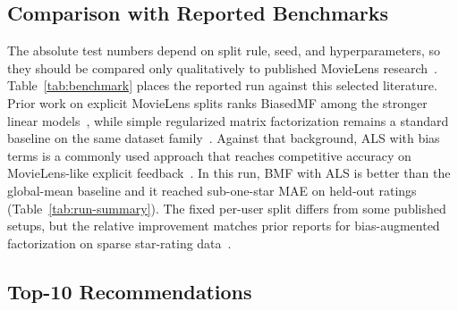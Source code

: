 \documentclass[conference]{IEEEtran}
\begin{document}
\subsection{Comparison with Reported Benchmarks}

The absolute test numbers depend on split rule, seed, and hyperparameters, so they should be compared only qualitatively to published MovieLens research~\cite{ref2,ref5}. Table~\ref{tab:benchmark} places the reported run against this selected literature. Prior work on explicit MovieLens splits ranks BiasedMF among the stronger linear models~\cite{ref2}, while simple regularized matrix factorization remains a standard baseline on the same dataset family~\cite{ref5}. Against that background, ALS with bias terms is a commonly used approach that reaches competitive accuracy on MovieLens-like explicit feedback~\cite{ref1}. In this run, BMF with ALS is better than the global-mean baseline and it reached sub-one-star MAE on held-out ratings (Table~\ref{tab:run-summary}). The fixed per-user split differs from some published setups, but the relative improvement matches prior reports for bias-augmented factorization on sparse star-rating data~\cite{ref1,ref2,ref10}.

\begin{table}[htbp]
\caption{Comparison with themes in the selected literature}
\label{tab:benchmark}
\centering
\small
{}
\end{table}

\subsection{Top-10 Recommendations}
\end{document}
